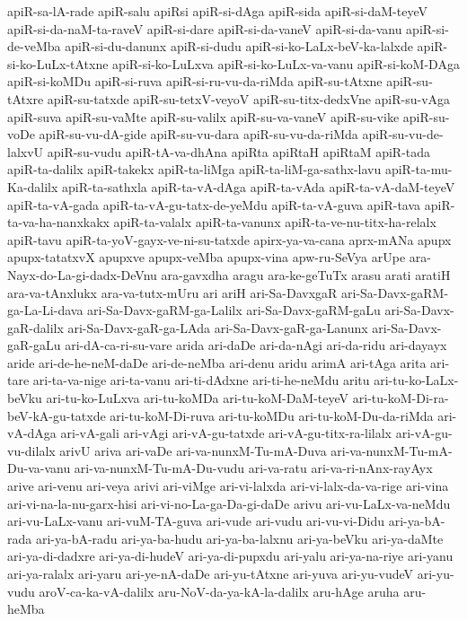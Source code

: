 {apiR-sa-lA-rade
apiR-salu
apiRsi
apiR-si-dAga
apiR-sida
apiR-si-daM-teyeV
apiR-si-da-naM-ta-raveV
apiR-si-dare
apiR-si-da-vaneV
apiR-si-da-vanu
apiR-si-de-veMba
apiR-si-du-danunx
apiR-si-dudu
apiR-si-ko-LaLx-beV-ka-lalxde
apiR-si-ko-LuLx-tAtxne
apiR-si-ko-LuLxva
apiR-si-ko-LuLx-va-vanu
apiR-si-koM-DAga
apiR-si-koMDu
apiR-si-ruva
apiR-si-ru-vu-da-riMda
apiR-su-tAtxne
apiR-su-tAtxre
apiR-su-tatxde
apiR-su-tetxV-veyoV
apiR-su-titx-dedxVne
apiR-su-vAga
apiR-suva
apiR-su-vaMte
apiR-su-valilx
apiR-su-va-vaneV
apiR-su-vike
apiR-su-voDe
apiR-su-vu-dA-gide
apiR-su-vu-dara
apiR-su-vu-da-riMda
apiR-su-vu-de-lalxvU
apiR-su-vudu
apiR-tA-va-dhAna
apiRta
apiRtaH
apiRtaM
apiR-tada
apiR-ta-dalilx
apiR-takekx
apiR-ta-liMga
apiR-ta-liM-ga-sathx-lavu
apiR-ta-mu-Ka-dalilx
apiR-ta-sathxla
apiR-ta-vA-dAga
apiR-ta-vAda
apiR-ta-vA-daM-teyeV
apiR-ta-vA-gada
apiR-ta-vA-gu-tatx-de-yeMdu
apiR-ta-vA-guva
apiR-tava
apiR-ta-va-ha-nanxkakx
apiR-ta-valalx
apiR-ta-vanunx
apiR-ta-ve-nu-titx-ha-relalx
apiR-tavu
apiR-ta-yoV-gayx-ve-ni-su-tatxde
apirx-ya-va-cana
aprx-mANa
apupx
apupx-tatatxvX
apupxve
apupx-veMba
apupx-vina
apw-ru-SeVya
arUpe
ara-Nayx-do-La-gi-dadx-DeVnu
ara-gavxdha
aragu
ara-ke-geTuTx
arasu
arati
aratiH
ara-va-tAnxlukx
ara-va-tutx-mUru
ari
ariH
ari-Sa-DavxgaR
ari-Sa-Davx-gaRM-ga-La-Li-dava
ari-Sa-Davx-gaRM-ga-Lalilx
ari-Sa-Davx-gaRM-gaLu
ari-Sa-Davx-gaR-dalilx
ari-Sa-Davx-gaR-ga-LAda
ari-Sa-Davx-gaR-ga-Lanunx
ari-Sa-Davx-gaR-gaLu
ari-dA-ca-ri-su-vare
arida
ari-daDe
ari-da-nAgi
ari-da-ridu
ari-dayayx
aride
ari-de-he-neM-daDe
ari-de-neMba
ari-denu
aridu
arimA
ari-tAga
arita
ari-tare
ari-ta-va-nige
ari-ta-vanu
ari-ti-dAdxne
ari-ti-he-neMdu
aritu
ari-tu-ko-LaLx-beVku
ari-tu-ko-LuLxva
ari-tu-koMDa
ari-tu-koM-DaM-teyeV
ari-tu-koM-Di-ra-beV-kA-gu-tatxde
ari-tu-koM-Di-ruva
ari-tu-koMDu
ari-tu-koM-Du-da-riMda
ari-vA-dAga
ari-vA-gali
ari-vAgi
ari-vA-gu-tatxde
ari-vA-gu-titx-ra-lilalx
ari-vA-gu-vu-dilalx
arivU
ariva
ari-vaDe
ari-va-nunxM-Tu-mA-Duva
ari-va-nunxM-Tu-mA-Du-va-vanu
ari-va-nunxM-Tu-mA-Du-vudu
ari-va-ratu
ari-va-ri-nAnx-rayAyx
arive
ari-venu
ari-veya
arivi
ari-viMge
ari-vi-lalxda
ari-vi-lalx-da-va-rige
ari-vina
ari-vi-na-la-nu-garx-hisi
ari-vi-no-La-ga-Da-gi-daDe
arivu
ari-vu-LaLx-va-neMdu
ari-vu-LaLx-vanu
ari-vuM-TA-guva
ari-vude
ari-vudu
ari-vu-vi-Didu
ari-ya-bA-rada
ari-ya-bA-radu
ari-ya-ba-hudu
ari-ya-ba-lalxnu
ari-ya-beVku
ari-ya-daMte
ari-ya-di-dadxre
ari-ya-di-hudeV
ari-ya-di-pupxdu
ari-yalu
ari-ya-na-riye
ari-yanu
ari-ya-ralalx
ari-yaru
ari-ye-nA-daDe
ari-yu-tAtxne
ari-yuva
ari-yu-vudeV
ari-yu-vudu
aroV-ca-ka-vA-dalilx
aru-NoV-da-ya-kA-la-dalilx
aru-hAge
aruha
aru-heMba
}
